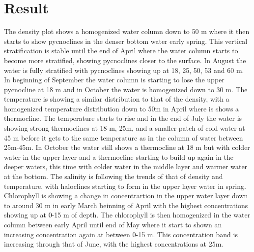 \documentclass[../Main.tex]{subfiles}
\begin{document}
\section{Result}
The density plot shows a homogenized water column down to 50 m where it then starts to show pycnoclines in the denser bottom water early spring. This vertical stratification is stable until the end of April where the water column starts to become more stratified, showing pycnoclines closer to the surface. In August the water is fully stratified with pycnoclines showing up at 18, 25, 50, 53 and 60 m. In beginning of September the water column is starting to lose the upper pycnocline at 18 m and in October the water is homogenized down to 30 m. The temperature is showing a similar distribution to that of the density, with a homogenized temperature distribution down to 50m in April where is shows a thermocline. The temperature starts to rise and in the end of July the water is showing strong thermoclines at 18 m, 25m, and a smaller patch of cold water at 45 m before it gets to the same temperature as in the column of water between 25m-45m. In October the water still shows a thermocline at 18 m but with colder water in the upper layer and a thermocline starting to build up again in the deeper waters, this time with colder water in the middle layer and warmer water at the bottom. The salinity is following the trends of that of density and temperature, with haloclines starting to form in the upper layer water in spring. Chlorophyll is showing a change in concentrartion in the upper water layer down to around 30 m in early March beinning of April with the highest concentrations showing up at 0-15 m of depth. The chlorophyll is then homogenized in the water column between early April until end of May where it start to shown an increasing concentration again at between 0-15 m. This concentration band is increasing through that of June, with the highest concentrations at 25m. 
\end{document}
